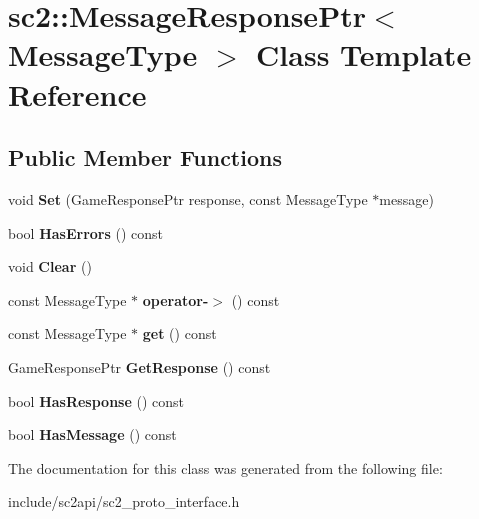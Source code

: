 \hypertarget{classsc2_1_1_message_response_ptr}{}\section{sc2\+:\+:Message\+Response\+Ptr$<$ Message\+Type $>$ Class Template Reference}
\label{classsc2_1_1_message_response_ptr}
\subsection*{Public Member Functions}
\begin{DoxyCompactItemize}
\item 
\mbox{\label{classsc2_1_1_message_response_ptr_a4686546e4f01d2e4af48d5a78cf461ca}} 
void {\bfseries Set} (Game\+Response\+Ptr response, const Message\+Type $\ast$message)
\item 
\mbox{\label{classsc2_1_1_message_response_ptr_a25f0140e53fa657b836ff77f94c60d3c}} 
bool {\bfseries Has\+Errors} () const
\item 
\mbox{\label{classsc2_1_1_message_response_ptr_ad7cf3848d52571d1b4dab01aa7cfc203}} 
void {\bfseries Clear} ()
\item 
\mbox{\label{classsc2_1_1_message_response_ptr_a399ff5e263733f475e258562b4acf530}} 
const Message\+Type $\ast$ {\bfseries operator-\/$>$} () const
\item 
\mbox{\label{classsc2_1_1_message_response_ptr_a677c317a807054a3cf6f1daaf03776b7}} 
const Message\+Type $\ast$ {\bfseries get} () const
\item 
\mbox{\label{classsc2_1_1_message_response_ptr_a7d2dbed4f52082f46fbc364eae0a8500}} 
Game\+Response\+Ptr {\bfseries Get\+Response} () const
\item 
\mbox{\label{classsc2_1_1_message_response_ptr_a3ae2b7c6816c8777f072d2a2d301166a}} 
bool {\bfseries Has\+Response} () const
\item 
\mbox{\label{classsc2_1_1_message_response_ptr_a5ac34b5e6eed83562c02be8c07cbb6f5}} 
bool {\bfseries Has\+Message} () const
\end{DoxyCompactItemize}


The documentation for this class was generated from the following file\+:\begin{DoxyCompactItemize}
\item 
include/sc2api/sc2\+\_\+proto\+\_\+interface.\+h\end{DoxyCompactItemize}
